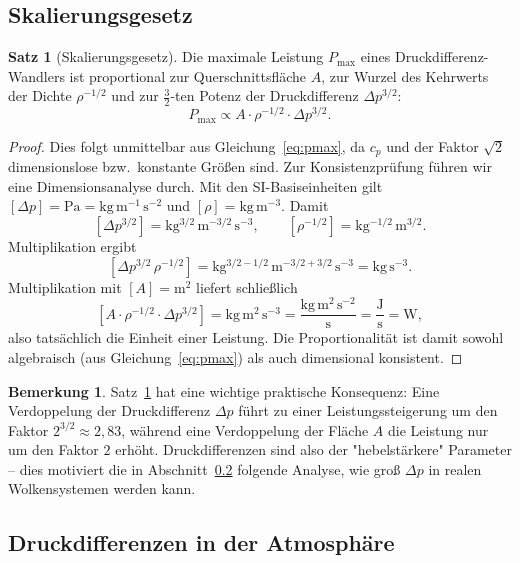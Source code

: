 ﻿\documentclass[a4paper,12pt]{article}
\theoremstyle{definition}
\newtheorem{satz}{Satz}
\newtheorem{bemerkung}{Bemerkung}
\begin{document}
\subsection{Skalierungsgesetz}

\begin{satz}[Skalierungsgesetz]
	\label{satz:skalierung}
	Die maximale Leistung $P_{\max}$ eines Druckdifferenz-Wandlers ist
	proportional zur Querschnittsfläche $A$, zur Wurzel des Kehrwerts
	der Dichte $\rho^{-1/2}$ und zur $\tfrac{3}{2}$-ten Potenz der
	Druckdifferenz $\Delta p^{3/2}$:
	\[
		P_{\max} \propto A \cdot \rho^{-1/2} \cdot \Delta p^{3/2}.
	\]
\end{satz}

\begin{proof}
	Dies folgt unmittelbar aus Gleichung~\eqref{eq:pmax}, da $c_p$ und
	der Faktor $\sqrt{2}$ dimensionslose bzw.\ konstante Größen sind.
	Zur Konsistenzprüfung führen wir eine Dimensionsanalyse durch.
	Mit den SI-Basiseinheiten gilt $[\Delta p] = \mathrm{Pa} =
	\mathrm{kg\,m^{-1}\,s^{-2}}$ und $[\rho] = \mathrm{kg\,m^{-3}}$.
	Damit
	\[
		\left[\Delta p^{3/2}\right]
		= \mathrm{kg^{3/2}\,m^{-3/2}\,s^{-3}},
		\qquad
		\left[\rho^{-1/2}\right]
		= \mathrm{kg^{-1/2}\,m^{3/2}}.
	\]
	Multiplikation ergibt
	\[
		\left[\Delta p^{3/2}\,\rho^{-1/2}\right]
		= \mathrm{kg^{3/2-1/2}\,m^{-3/2+3/2}\,s^{-3}}
		= \mathrm{kg\,s^{-3}}.
	\]
	Multiplikation mit $[A] = \mathrm{m^2}$ liefert schließlich
	\[
		\left[A \cdot \rho^{-1/2} \cdot \Delta p^{3/2}\right]
		= \mathrm{kg\,m^2\,s^{-3}}
		= \frac{\mathrm{kg\,m^2\,s^{-2}}}{\mathrm{s}}
		= \frac{\mathrm{J}}{\mathrm{s}}
		= \mathrm{W},
	\]
	also tatsächlich die Einheit einer Leistung. Die Proportionalität ist
	damit sowohl algebraisch (aus Gleichung~\eqref{eq:pmax}) als auch
	dimensional konsistent.
\end{proof}

\begin{bemerkung}
	Satz~\ref{satz:skalierung} hat eine wichtige praktische Konsequenz:
	Eine Verdoppelung der Druckdifferenz $\Delta p$ führt zu einer
	Leistungssteigerung um den Faktor $2^{3/2} \approx 2{,}83$, während
	eine Verdoppelung der Fläche $A$ die Leistung nur um den Faktor $2$
	erhöht. Druckdifferenzen sind also der "hebelstärkere" Parameter --
	dies motiviert die in Abschnitt~\ref{sec:atmosphaere} folgende
	Analyse, wie groß $\Delta p$ in realen Wolkensystemen werden kann.
\end{bemerkung}

\subsection{Druckdifferenzen in der Atmosphäre}
\label{sec:atmosphaere}
\end{document}
